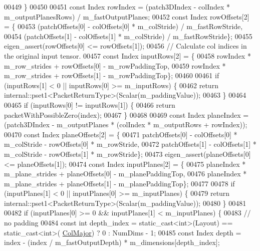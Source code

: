 \begin{DoxyCode}
00449     \}
00450 
00451     \textcolor{keyword}{const} Index rowIndex = (patch3DIndex - colIndex * m\_outputPlanesRows) / m\_fastOutputPlanes;
00452     \textcolor{keyword}{const} Index rowOffsets[2] = \{
00453       (patchOffsets[0] - colOffsets[0] * m\_colStride) / m\_fastRowStride,
00454       (patchOffsets[1] - colOffsets[1] * m\_colStride) / m\_fastRowStride\};
00455     eigen\_assert(rowOffsets[0] <= rowOffsets[1]);
00456     \textcolor{comment}{// Calculate col indices in the original input tensor.}
00457     \textcolor{keyword}{const} Index inputRows[2] = \{
00458       rowIndex * m\_row\_strides + rowOffsets[0] - m\_rowPaddingTop,
00459       rowIndex * m\_row\_strides + rowOffsets[1] - m\_rowPaddingTop\};
00460 
00461     \textcolor{keywordflow}{if} (inputRows[1] < 0 || inputRows[0] >= m\_inputRows) \{
00462       \textcolor{keywordflow}{return} internal::pset1<PacketReturnType>(Scalar(m\_paddingValue));
00463     \}
00464 
00465     \textcolor{keywordflow}{if} (inputRows[0] != inputRows[1]) \{
00466       \textcolor{keywordflow}{return} packetWithPossibleZero(index);
00467     \}
00468 
00469     \textcolor{keyword}{const} Index planeIndex = (patch3DIndex - m\_outputPlanes * (colIndex * m\_outputRows + rowIndex));
00470     \textcolor{keyword}{const} Index planeOffsets[2] = \{
00471       patchOffsets[0] - colOffsets[0] * m\_colStride - rowOffsets[0] * m\_rowStride,
00472       patchOffsets[1] - colOffsets[1] * m\_colStride - rowOffsets[1] * m\_rowStride\};
00473     eigen\_assert(planeOffsets[0] <= planeOffsets[1]);
00474     \textcolor{keyword}{const} Index inputPlanes[2] = \{
00475       planeIndex * m\_plane\_strides + planeOffsets[0] - m\_planePaddingTop,
00476       planeIndex * m\_plane\_strides + planeOffsets[1] - m\_planePaddingTop\};
00477 
00478     \textcolor{keywordflow}{if} (inputPlanes[1] < 0 || inputPlanes[0] >= m\_inputPlanes) \{
00479       \textcolor{keywordflow}{return} internal::pset1<PacketReturnType>(Scalar(m\_paddingValue));
00480     \}
00481 
00482     \textcolor{keywordflow}{if} (inputPlanes[0] >= 0 && inputPlanes[1] < m\_inputPlanes) \{
00483       \textcolor{comment}{// no padding}
00484       \textcolor{keyword}{const} \textcolor{keywordtype}{int} depth\_index = \textcolor{keyword}{static\_cast<}\textcolor{keywordtype}{int}\textcolor{keyword}{>}(Layout) == static\_cast<int>(
      \hyperlink{group__enums_ggaacded1a18ae58b0f554751f6cdf9eb13a0cbd4bdd0abcfc0224c5fcb5e4f6669a}{ColMajor}) ? 0 : NumDims - 1;
00485       \textcolor{keyword}{const} Index depth = index - (index / m\_fastOutputDepth) * m\_dimensions[depth\_index];

\end{DoxyCode}
